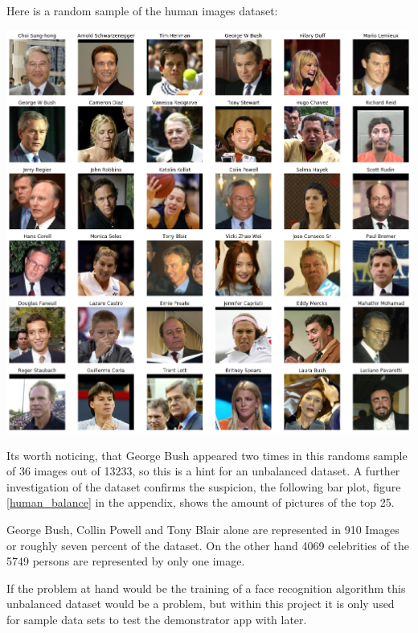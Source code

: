 \documentclass[paper=A4, DIV=10, parskip=half]{scrartcl}
\begin{document}
Here is a random sample of the human images dataset:

\includegraphics[width=\textwidth]{images/human_sample.png}

Its worth noticing, that George Bush appeared two times in this randoms sample
of 36 images out of 13233, so this is a hint for an unbalanced dataset. A
further investigation of the dataset confirms the suspicion, the following bar
plot, figure \ref{human_balance} in the appendix, shows the amount of pictures
of the top 25.

George Bush, Collin Powell and Tony Blair alone are represented in 910 Images or
roughly seven percent of the dataset. On the other hand 4069 celebrities of the
5749 persons are represented by only one image.


If the problem at hand would be the training of a face recognition algorithm
this unbalanced dataset would be a problem, but within this project it is only
used for sample data sets to test the demonstrator app with later.
\end{document}
